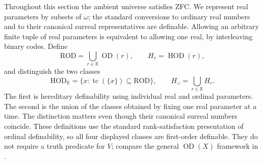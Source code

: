 \documentclass[11pt,a4paper]{article}
\numberwithin{equation}{section}
\theoremstyle{definition}
\theoremstyle{remark}
\newcommand{\HOD}{\mathrm{HOD}}
\newcommand{\R}{\mathbb R}
\newcommand{\ROD}{\mathrm{ROD}}
\newcommand{\HR}{\HOD_{\R}}
\newcommand{\Hcup}{H_{\cup}}
\begin{document}
Throughout this section the ambient universe satisfies ZFC.  We represent
real parameters by subsets of $\omega$; the standard conversions to
ordinary real numbers and to their canonical surreal representatives are
definable.  Allowing an arbitrary finite tuple of real parameters is
equivalent to allowing one real, by interleaving binary codes.  Define
\[
 \ROD=\bigcup_{r\in\mathbb R}\operatorname{OD}(r),
 \qquad
 H_r=\operatorname{HOD}(r),
\]
and distinguish the two classes
\begin{equation}\label{dsn:rp:eq:two-unions}
 \HR
  =\{x:\operatorname{tc}(\{x\})\subseteq\ROD\},
 \qquad
 \Hcup=\bigcup_{r\in\mathbb R}H_r.
\end{equation}
The first is hereditary definability using individual real and ordinal
parameters.  The second is the union of the classes obtained by fixing
one real parameter at a time.  The distinction matters even though
their canonical surreal numbers coincide.  These definitions use the
standard rank-satisfaction presentation of ordinal definability, so all
four displayed classes are first-order definable.  They do not require
a truth predicate for $V$; compare the general $\operatorname{OD}(X)$
framework in \cite[Section~4]{DoraisHamkins}.
\end{document}
